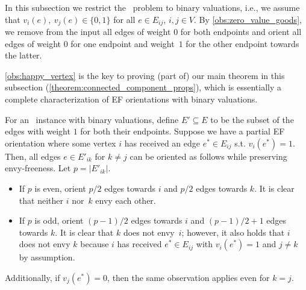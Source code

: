\documentclass[11pt,letterpaper]{article}
\begin{document}
In this subsection we restrict the \EFo\ problem to binary valuations, i.e., we assume that $v_i(e),\ v_j(e) \in \{0,1\}$ for all $e\in E_{ij}$, $i,j\in V$.
By \cref{obs:zero_value_goods}, we remove from the input all edges of weight $0$ for both endpoints and orient all edges of weight $0$ for one endpoint and weight~$1$ for the other endpoint towards the latter.


\cref{obs:happy_vertex} is the key to proving (part of) our main theorem in this subsection (\cref{theorem:connected_component_props}), which is essentially a complete characterization of EF orientations with binary valuations.

\begin{observation}\label{obs:happy_vertex}
    For an \EFo\ instance with binary valuations, define $E'\subseteq E$ to be the subset of the edges with weight $1$ for both their endpoints. Suppose we have a partial EF orientation where some vertex $i$ has received an edge $e^*\in E_{ij}$ s.t. $v_i(e^*)=1$. Then, all edges $e\in E'_{ik}$ for $k\neq j$ can be oriented as follows while preserving envy-freeness. Let $p=|E'_{ik}|$.
    \begin{itemize}
        \item If $p$ is even, orient $p/2$ edges towards $i$ and $p/2$ edges towards $k$. It is clear that neither $i$ nor~$k$ envy each other.
        \item If $p$ is odd, orient $(p-1)/2$ edges towards $i$ and $(p-1)/2 +1$ edges towards $k$. It is clear that $k$ does not envy~$i$; however, it also holds that $i$ does not envy $k$ because $i$ has received $e^*\in E_{ij}$ with $v_i(e^*)=1$ and $j\neq k$ by assumption.
    \end{itemize}
    Additionally, if $v_j(e^*)=0$, then the same observation applies even for $k = j$.
\end{observation}
\end{document}
